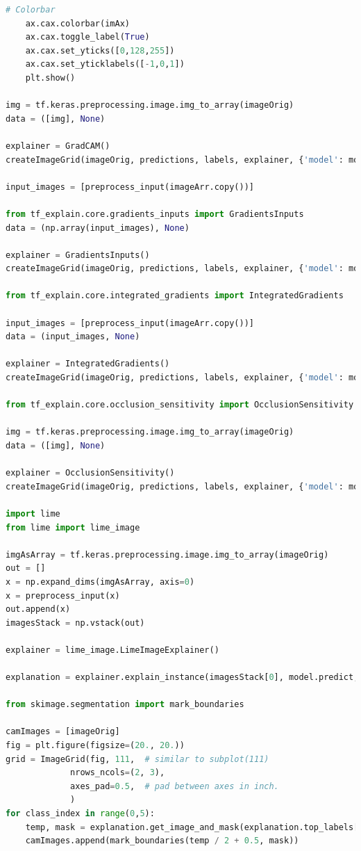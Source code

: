 \documentclass[
  12pt, %
  a4paper, %
  oneside, %
  openany, 
  numbers=noenddot, %
  BCOR=5mm, %
  parskip=half*, %
  thesis, %
]{bfhbook}
\begin{document}
\begin{lstlisting}[language=Python, caption=Visualisierungen der fünf wahrscheinlichsten Klassen mit verschiedenen Verfahren]
    # Colorbar
    ax.cax.colorbar(imAx)
    ax.cax.toggle_label(True)
    ax.cax.set_yticks([0,128,255])
    ax.cax.set_yticklabels([-1,0,1])
    plt.show()

img = tf.keras.preprocessing.image.img_to_array(imageOrig)
data = ([img], None)
    
explainer = GradCAM()
createImageGrid(imageOrig, predictions, labels, explainer, {'model': model, 'layer_name': 'block5_conv3', 'validation_data': data})

input_images = [preprocess_input(imageArr.copy())]

from tf_explain.core.gradients_inputs import GradientsInputs
data = (np.array(input_images), None)

explainer = GradientsInputs()
createImageGrid(imageOrig, predictions, labels, explainer, {'model': model, 'validation_data': data})

from tf_explain.core.integrated_gradients import IntegratedGradients

input_images = [preprocess_input(imageArr.copy())]
data = (input_images, None)

explainer = IntegratedGradients()
createImageGrid(imageOrig, predictions, labels, explainer, {'model': model, 'validation_data': data})

from tf_explain.core.occlusion_sensitivity import OcclusionSensitivity

img = tf.keras.preprocessing.image.img_to_array(imageOrig)
data = ([img], None)

explainer = OcclusionSensitivity()
createImageGrid(imageOrig, predictions, labels, explainer, {'model': model, 'validation_data': data, 'patch_size': 40})

import lime 
from lime import lime_image

imgAsArray = tf.keras.preprocessing.image.img_to_array(imageOrig)
out = []
x = np.expand_dims(imgAsArray, axis=0)
x = preprocess_input(x)
out.append(x)
imagesStack = np.vstack(out)
            
explainer = lime_image.LimeImageExplainer()

explanation = explainer.explain_instance(imagesStack[0], model.predict, top_labels=5, hide_color=0, num_samples=1000)

from skimage.segmentation import mark_boundaries

camImages = [imageOrig]
fig = plt.figure(figsize=(20., 20.))
grid = ImageGrid(fig, 111,  # similar to subplot(111)
             nrows_ncols=(2, 3),
             axes_pad=0.5,  # pad between axes in inch.
             )
for class_index in range(0,5):
    temp, mask = explanation.get_image_and_mask(explanation.top_labels[class_index], positive_only=True, num_features=5, hide_rest=True)
    camImages.append(mark_boundaries(temp / 2 + 0.5, mask))


\end{lstlisting}
\end{document}
